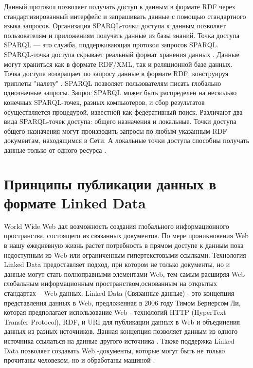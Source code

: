 Данный протокол позволяет получать доступ к данным в формате RDF через стандартизированный интерфейс и запрашивать данные с помощью стандартного языка запросов. Организация SPARQL-точки доступа к данным позволяет пользователям и приложениям получать данные из базы знаний. Точка доступа SPARQL — это служба, поддерживающая протокол запросов SPARQL. SPARQL-точка доступа скрывает реальный формат хранения данных \cite{perez2009semantics}. Данные могут храниться как в формате RDF/XML, так и реляционной базе данных. Точка доступа возвращает по запросу данные в формате RDF, конструируя триплеты "налету" \cite{quilitz2008querying}. SPARQL позволяет пользователям писать глобально однозначные запросы. Запрос SPARQL может быть распределен на несколько конечных SPARQL-точек, разных компьютеров, и сбор результатов осуществляется процедурой, известной как федеративный поиск. Различают два вида SPARQL-точек доступа: общего назначения и локальные. Точки доступа общего назначения могут производить запросы по любым указанным RDF-документам, находящимся в Сети. А локальные точки доступа способны получать данные только от одного ресурса \cite{hartig2009executing}.



\section{Принципы публикации данных в формате Linked Data} \label{sect1_5}

World Wide Web дал возможность создания глобального информационного пространства, состоящего из связанных документов. По мере проникновения Web в нашу ежедневную жизнь растет потребность в прямом доступе к данным пока недоступным из Web или ограниченным гипертекстовыми ссылками. Технология Linked Data предоставляет подход, при котором не только документы, но и данные могут стать полноправными элементами Web, тем самым
расширяя Web глобальным информационным пространством,основанным на открытых стандартах – Web данных. Linked Data (Связанные данные) - это концепция представления данных в Web, предложенная в 2006 году Тимом Бернерсом Ли, которая предполагает использование Web - технологий HTTP (HyperText Transfer Protocol), RDF, и URI для публикации данных в Web и объединения данных из разных источников. Данная концепция позволяет данным из одного источника ссылаться на данные другого источника \cite{heath2011linked}. Также поддержка Linked Data позволяет создавать Web -документы, которые могут быть не только прочитаны человеком, но и обработаны машиной \cite{bizer2009linked}. 

